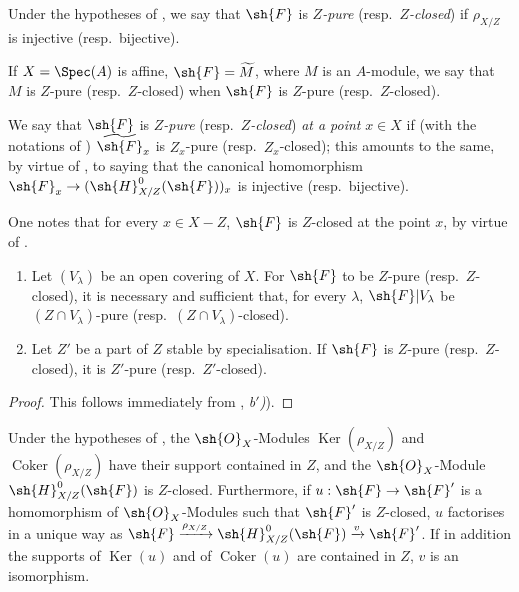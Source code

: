 \begin{definition}[5.9.9]
\label{IV.5.9.9}
Under the hypotheses of , we say that $\sh{F}$ is \emph{$Z$-pure} (resp.\ \emph{$Z$-closed}) if $\rho_{X/Z}$ is injective (resp.\ bijective).
\end{definition}

If $X=\Spec(A)$ is affine, $\sh{F}=\widetilde{M}$, where $M$ is an $A$-module, we say that $M$ is $Z$-pure (resp.\ $Z$-closed) when $\sh{F}$ is $Z$-pure (resp.\ $Z$-closed).

We say that $\sh{F}$ is \emph{$Z$-pure} (resp.\ \emph{$Z$-closed}) \emph{at a point} $x\in X$ if (with the notations of ) $\widetilde{\sh{F}}_x$ is $Z_x$-pure (resp.\ $Z_x$-closed); this amounts to the same, by virtue of , to saying that the canonical homomorphism $\sh{F}_x\to(\sh{H}^0_{X/Z}(\sh{F}))_x$ is injective (resp.\ bijective).

One notes that for every $x\in X-Z$, $\sh{F}$ is $Z$-closed at the point $x$, by virtue of .

\begin{corollary}[5.9.10]
\label{IV.5.9.10}
\begin{enumerate}[label=\emph{\roman*)}]
  \item Let $(V_\lambda)$ be an open covering of $X$.
For $\sh{F}$ to be $Z$-pure (resp.\ $Z$-closed), it is necessary and sufficient that, for every $\lambda$, $\sh{F}|V_\lambda$ be $(Z\cap V_\lambda)$-pure (resp.\ $(Z\cap V_\lambda)$-closed).
  \item Let $Z'$ be a part of $Z$ stable by specialisation.
If $\sh{F}$ is $Z$-pure (resp.\ $Z$-closed), it is $Z'$-pure (resp.\ $Z'$-closed).
\end{enumerate}
\end{corollary}

\begin{proof}
This follows immediately from , \emph{b${}'$)}).
\end{proof}

\begin{proposition}[5.9.11]
\label{IV.5.9.11}
Under the hypotheses of , the $\sh{O}_X$-Modules $\operatorname{Ker}(\rho_{X/Z})$ and $\operatorname{Coker}(\rho_{X/Z})$ have their support contained in $Z$, and the $\sh{O}_X$-Module $\sh{H}^0_{X/Z}(\sh{F})$ is $Z$-closed.
Furthermore, if $u:\sh{F}\to\sh{F}'$ is a homomorphism of $\sh{O}_X$-Modules such that $\sh{F}'$ is $Z$-closed, $u$ factorises in a unique way as $\sh{F}\xrightarrow{\rho_{X/Z}}\sh{H}^0_{X/Z}(\sh{F})\xrightarrow{v}\sh{F}'$.
If in addition the supports of $\operatorname{Ker}(u)$ and of $\operatorname{Coker}(u)$ are contained in $Z$, $v$ is an isomorphism.
\end{proposition}

